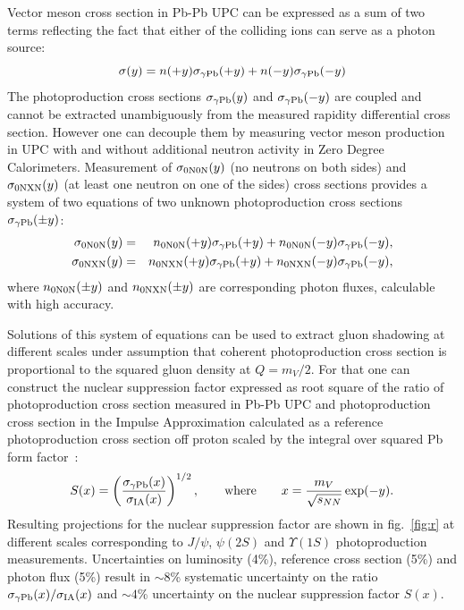 \documentclass[../report.tex]{subfiles}
\begin{document}
Vector meson cross section in Pb-Pb UPC can be expressed as a sum of two terms reflecting the fact that either of the colliding ions can serve as a photon source:
\begin{equation}
\sigma(y) = n(+y) \sigma_{\rm \gamma Pb}(+y) + n(-y) \sigma_{\rm \gamma Pb}(-y)
\end{equation}
The photoproduction cross sections $\sigma_{\rm \gamma Pb}(y)$ and $\sigma_{\rm \gamma Pb}(-y)$ are coupled and cannot be extracted unambiguously from the measured rapidity differential cross section. However one can decouple them by measuring vector meson production in UPC with and without additional neutron activity in Zero Degree Calorimeters. Measurement of $\sigma_{\rm 0N0N}(y)$ (no neutrons on both sides) and $\sigma_{\rm 0NXN}(y)$ (at least one neutron on one of the sides) cross sections provides a system of two equations of two unknown photoproduction cross sections $\sigma_{\rm \gamma Pb}(\pm y)$:
\begin{eqnarray}
\sigma_{\rm 0N0N}(y) &=& n_{\rm 0N0N}(+y) \sigma_{\rm \gamma Pb}(+y) + n_{\rm 0N0N}(-y) \sigma_{\rm \gamma Pb}(-y), \\
\sigma_{\rm 0NXN}(y) &=& n_{\rm 0NXN}(+y) \sigma_{\rm \gamma Pb}(+y) + n_{\rm 0NXN}(-y) \sigma_{\rm \gamma Pb}(-y),
\end{eqnarray}
where $n_{\rm 0N0N}(\pm y)$ and $n_{\rm 0NXN}(\pm y)$ are corresponding photon fluxes, calculable with high accuracy.

Solutions of this system of equations can be used to extract gluon shadowing at different scales under assumption that coherent photoproduction cross section is proportional to the squared gluon density at $Q = m_{V}/2$. For that  one can construct the nuclear suppression factor expressed as root square of the ratio of photoproduction cross section measured in Pb-Pb UPC and photoproduction cross section in the Impulse Approximation calculated as a reference photoproduction cross section off proton scaled by the integral over squared Pb form factor~\cite{Guzey:2013xba}:
\begin{equation}
S (x) = \left(\frac{\sigma_{\rm \gamma Pb}(x)}{\sigma_{\rm IA}(x)}\right)^{1/2}, \qquad {\rm where}\qquad x  = \frac{m_{V}}{\sqrt{s_{NN}}}\exp(-y).
\end{equation}
Resulting projections for the nuclear suppression factor are shown in fig.~\ref{fig:r} at different scales corresponding to $J/\psi$, $\psi(2S)$ and $\Upsilon(1S)$ photoproduction measurements. Uncertainties on luminosity (4\%), reference cross section (5\%) and photon flux (5\%) result in $\sim8$\% systematic uncertainty on the ratio $\sigma_{\rm \gamma Pb}(x)/\sigma_{\rm IA}(x)$ and $\sim 4$\% uncertainty on the nuclear suppression factor $S (x)$.
\end{document}
